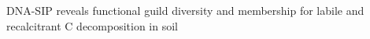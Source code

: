 DNA-SIP reveals functional guild diversity and membership for labile and
recalcitrant C decomposition in soil
